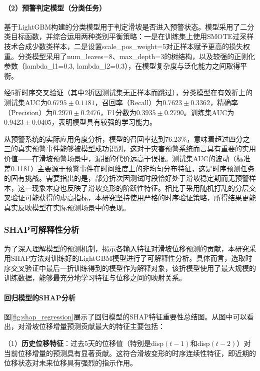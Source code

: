 \documentclass[12pt,a4paper]{article}
\begin{document}
\paragraph{（2）预警判定模型（分类任务）}

基于LightGBM构建的分类模型用于判定滑坡是否进入预警状态。模型采用了二分类目标函数，并综合运用两种类别平衡策略：一是在训练集上使用SMOTE过采样技术合成少数类样本，二是设置scale\_pos\_weight=5对正样本赋予更高的损失权重。分类模型采用了num\_leaves=8、max\_depth=3的树结构，以及较强的正则化参数（lambda\_l1=0.3, lambda\_l2=0.3），在模型复杂度与泛化能力之间取得平衡。

经5折时序交叉验证（其中2折因测试集无正样本而跳过），分类模型在有效折上的测试集AUC为$0.6795 \pm 0.1181$，召回率（Recall）为$0.7623 \pm 0.3362$，精确率（Precision）为$0.2970 \pm 0.2476$，F1分数为$0.3935 \pm 0.2790$。训练集AUC为$0.9423 \pm 0.0405$，表明模型具有较强的学习能力。

从预警系统的实际应用角度分析，模型的召回率达到76.23\%，意味着超过四分之三的真实预警事件能够被模型成功识别，这对于灾害预警系统而言具有重要的实用价值——在滑坡预警场景中，漏报的代价远高于误报。测试集AUC的波动（标准差0.1181）主要源于预警事件在时间维度上的非均匀分布特征，这是时序预测任务的固有挑战。需要指出的是，部分折次因测试时段恰好处于滑坡稳定期而无预警样本，这一现象本身也反映了滑坡变形的阶跃性特征。相比于采用随机打乱的分层交叉验证可能获得的虚高指标，本研究坚持使用严格的时序验证策略，所得结果更能真实反映模型在实际预测场景中的表现。

\subsubsection{SHAP可解释性分析}

为了深入理解模型的预测机制，揭示各输入特征对滑坡位移预测的贡献，本研究采用SHAP方法对训练好的LightGBM模型进行了可解释性分析。具体而言，选取时序交叉验证中最后一折训练得到的模型作为解释对象，该折模型使用了最大规模的训练数据，能够最充分地学习特征与位移之间的映射关系。

\paragraph{\textbf{回归模型的SHAP分析}}

图\ref{fig:shap_regression}展示了回归模型的SHAP特征重要性总结图。从图中可以看出，对滑坡位移增量预测贡献最大的特征主要包括：

    （1）\textbf{历史位移特征}：过去5天的位移值（特别是disp$(t-1)$和disp$(t-2)$）对当前位移增量的预测具有显著贡献。这符合滑坡变形的时序连续性特征，即近期的位移状态对未来位移具有强烈的指示作用。
\end{document}
